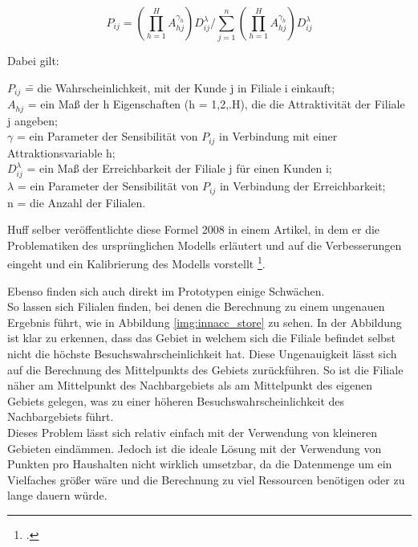 \begin{equation}
	P_{i j}=\left(\prod_{h=1}^{H} A_{h j}^{\gamma_{h}}\right) D_{i j}^{\lambda} / \sum_{j=1}^{n}\left(\prod_{h=1}^{H} A_{h j}^{\gamma_{h}}\right) D_{i j}^{\lambda}
\end{equation}

Dabei gilt:

\begin{tabbing}
	\( P_{i j} \) \= = die Wahrscheinlichkeit, mit der Kunde j in Filiale i einkauft;\\
	\( A_{h j} \) \> = ein Maß der h Eigenschaften (h = 1,2,.H), die die Attraktivität der Filiale j angeben;\\
	\( \gamma \) \> = ein Parameter der Sensibilität von \(P_{i j}\) in Verbindung mit einer Attraktionsvariable h;\\
	\( D_{i j}^{\lambda} \)	\> = ein Maß der Erreichbarkeit der Filiale j für einen Kunden i;\\
	\( {\lambda} \)	\> = ein Parameter der Sensibilität von \(P_{i j}\) in Verbindung der Erreichbarkeit;\\
	n \> = die Anzahl der Filialen.
\end{tabbing}

Huff selber veröffentlichte diese Formel 2008 in einem Artikel, in dem er die Problematiken des ursprünglichen Modells erläutert und auf die Verbesserungen eingeht und ein Kalibrierung des Modells vorstellt \footcite{huff_calibrating_2008}.

Ebenso finden sich auch direkt im Prototypen einige Schwächen.\\
So lassen sich Filialen finden, bei denen die Berechnung zu einem ungenauen Ergebnis führt, wie in Abbildung \ref{img:innacc_store} zu sehen.
In der Abbildung ist klar zu erkennen, dass das Gebiet in welchem sich die Filiale befindet selbst nicht die höchste Besuchswahrscheinlichkeit hat.
Diese Ungenauigkeit lässt sich auf die Berechnung des Mittelpunkts des Gebiets zurückführen.
So ist die Filiale näher am Mittelpunkt des Nachbargebiets als am Mittelpunkt des eigenen Gebiets gelegen, was zu einer höheren Besuchswahrscheinlichkeit des Nachbargebiets führt.\\
Dieses Problem lässt sich relativ einfach mit der Verwendung von kleineren Gebieten eindämmen.
Jedoch ist die ideale Lösung mit der Verwendung von Punkten pro Haushalten nicht wirklich umsetzbar, da die Datenmenge um ein Vielfaches größer wäre und die Berechnung zu viel Ressourcen benötigen oder zu lange dauern würde.

